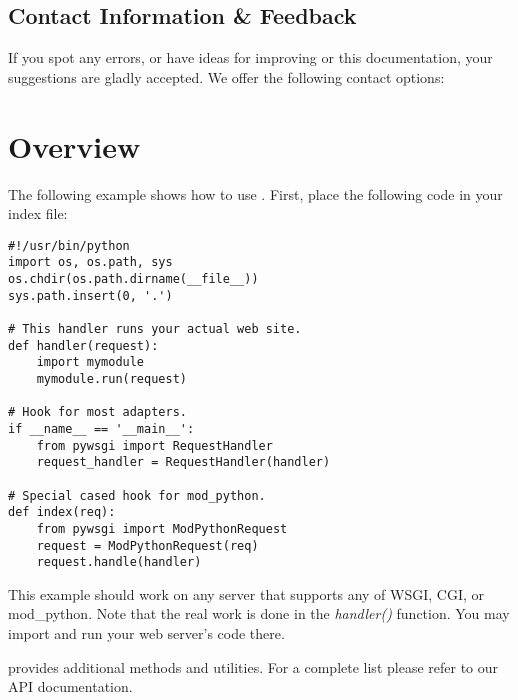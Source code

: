 \subsection{Contact Information \& Feedback}

If you spot any errors, or have ideas for improving \product or this 
documentation, your suggestions are gladly accepted.
We offer the following contact options: \\



\newpage
\section{Overview}

The following example shows how to use \product. First, place the following 
code in your index file:

\begin{lstlisting}
#!/usr/bin/python
import os, os.path, sys
os.chdir(os.path.dirname(__file__))
sys.path.insert(0, '.')

# This handler runs your actual web site.
def handler(request):
    import mymodule
    mymodule.run(request)

# Hook for most adapters.
if __name__ == '__main__':
    from pywsgi import RequestHandler
    request_handler = RequestHandler(handler)

# Special cased hook for mod_python.
def index(req):
    from pywsgi import ModPythonRequest
    request = ModPythonRequest(req)
    request.handle(handler)
\end{lstlisting}

This example should work on any server that supports any of WSGI, CGI, or
mod\_python. Note that the real work is done in the {\it handler()} function.
You may import and run your web server's code there.

\product provides additional methods and utilities.
For a complete list please refer to our API documentation.

